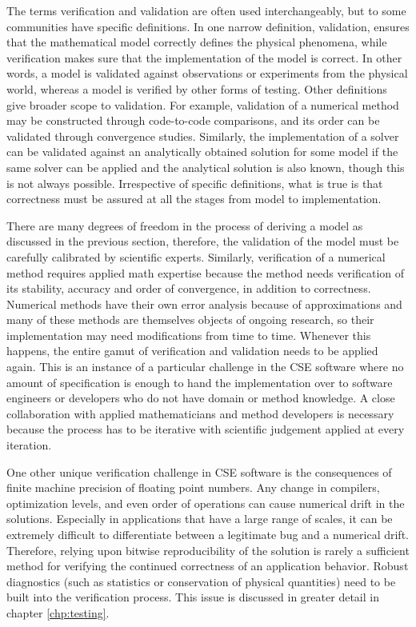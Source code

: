 The terms verification and
validation are often used interchangeably, but to some communities have specific definitions.  
In one narrow definition, validation, ensures that the
mathematical model correctly defines the physical phenomena, while
verification makes sure that the implementation of the model is
correct. In other words, a model is validated against observations or
experiments from the physical world, whereas a model is verified by
other forms of testing.   Other definitions give broader scope to 
validation. For example, validation of a numerical
method may be constructed through code-to-code comparisons, and its
order can be validated through convergence studies. Similarly, the
implementation of a solver can be validated against an analytically
obtained solution for some model if the same solver can be
applied and the analytical solution is also known, though this is not
always possible.  Irrespective of  specific definitions, what is true is that
correctness must be assured at all the stages from model to
implementation.  

There are many degrees of freedom in the process of deriving a
model as discussed in the previous section, therefore, the validation of the
model must be carefully calibrated by scientific experts. Similarly,
verification of a numerical method requires applied math expertise
because the method needs verification of its stability, accuracy and
order of convergence, in addition to correctness. Numerical methods
have their own error analysis because of approximations and many of
these methods are themselves objects of ongoing research, so their
implementation may need modifications from time to time. Whenever
this happens, the entire gamut of verification and validation needs to
be applied again. This is an instance of a particular challenge in the
CSE software where no amount of specification is enough to hand the
implementation over to software engineers or developers who do not have domain or method knowledge. A close
collaboration with applied mathematicians and method developers is necessary because the process has to be iterative with
scientific judgement applied at every iteration. 

One other unique verification challenge in CSE software is the
consequences of finite machine precision of floating point
numbers. Any change in compilers, optimization levels, and even order
of operations can cause numerical drift in the solutions. Especially
in applications that have a large range of scales, it can be extremely
difficult to differentiate between a legitimate bug and a numerical
drift. Therefore, relying upon bitwise reproducibility of the solution is
rarely a sufficient method for verifying the continued correctness of
an application behavior. Robust diagnostics (such as statistics or
conservation of physical quantities) need to be built into the
verification process.  This issue is
discussed in greater detail in chapter \ref{chp:testing}.

